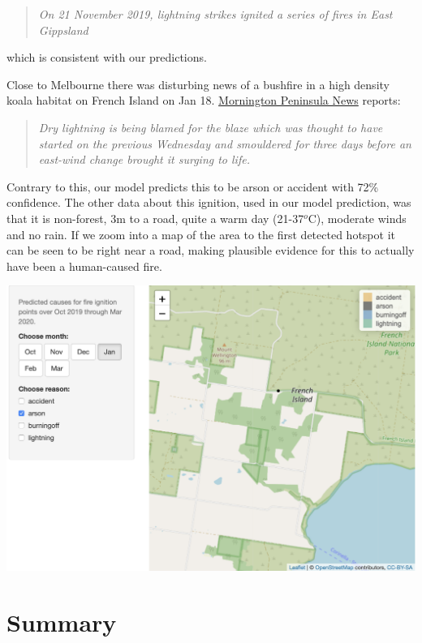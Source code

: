 \documentclass[
  11pt,
  a4paper,
]{article}
\begin{document}
\begin{quote}
\emph{On 21 November 2019, lightning strikes ignited a series of fires in East Gippsland}
\end{quote}

which is consistent with our predictions.

Close to Melbourne there was disturbing news of a bushfire in a high density koala habitat on French Island on Jan 18. \href{http://www.mpnews.com.au/2020/01/21/all-clear-after-island-fire-fright/}{Mornington Peninsula News} reports:

\begin{quote}
\emph{Dry lightning is being blamed for the blaze which was thought to have started on the previous Wednesday and smouldered for three days before an east-wind change brought it surging to life.}
\end{quote}

Contrary to this, our model predicts this to be arson or accident with 72\% confidence. The other data about this ignition, used in our model prediction, was that it is non-forest, 3m to a road, quite a warm day (21-37\(^o\)C), moderate winds and no rain. If we zoom into a map of the area to the first detected hotspot it can be seen to be right near a road, making plausible evidence for this to actually have been a human-caused fire.

\includegraphics{french_island.png}

\hypertarget{summary}{%
\section{Summary}\label{summary}}
\end{document}
